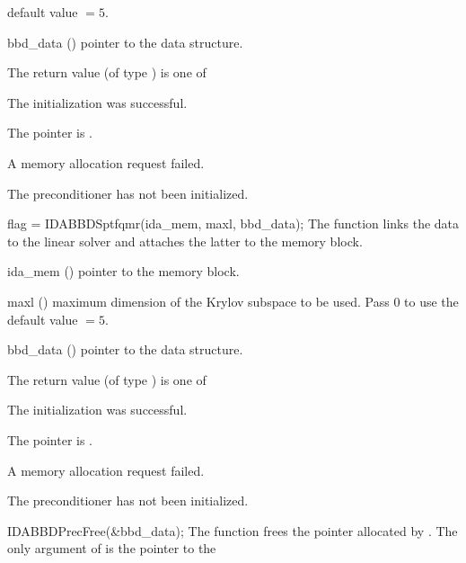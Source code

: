 {{\begin{args}
    default value $=5$.
  \item[bbd\_data] ()
    pointer to the {\idabbdpre} data structure.
  \end{args}
}
{
  The return value  (of type ) is one of
  \begin{args}
  \item[\Id{IDASPBCG\_SUCCESS}] 
    The {\idaspbcg} initialization was successful.
  \item[\Id{IDASPBCG\_MEM\_NULL}]
    The  pointer is .
  \item[\Id{IDASPBCG\_MEM\_FAIL}]
    A memory allocation request failed.
  \item[\Id{IDA\_PDATA\_NULL}]
    The {\idabbdpre} preconditioner has not been initialized.
  \end{args}
}
{}
{
  flag = IDABBDSptfqmr(ida\_mem, maxl, bbd\_data);
}
{
  The function  links the {\idabbdpre} data to the
  {\idasptfqmr} linear solver and attaches the latter to the {\ida}
  memory block.
}
{
  \begin{args}
  \item[ida\_mem] ()
    pointer to the {\ida} memory block.
  \item[maxl] ()
    maximum dimension of the Krylov subspace to be used. Pass $0$ to use the 
    default value $=5$.
  \item[bbd\_data] ()
    pointer to the {\idabbdpre} data structure.
  \end{args}
}
{
  The return value  (of type ) is one of
  \begin{args}
  \item[\Id{IDASPTFQMR\_SUCCESS}] 
    The {\idasptfqmr} initialization was successful.
  \item[\Id{IDASPTFQMR\_MEM\_NULL}]
    The  pointer is .
  \item[\Id{IDASPTFQMR\_MEM\_FAIL}]
    A memory allocation request failed.
  \item[\Id{IDA\_PDATA\_NULL}]
    The {\idabbdpre} preconditioner has not been initialized.
  \end{args}
}
{}
{
  IDABBDPrecFree(\&bbd\_data);
}
{
  The function  frees the pointer allocated by
  .
}
{
  The only argument of  is the pointer to the {\idabbdpre} 
}}

